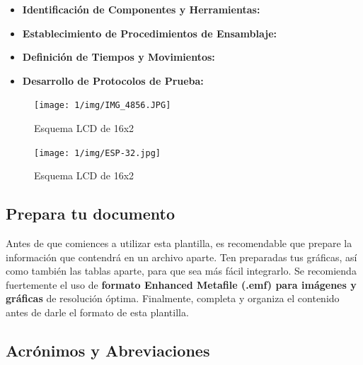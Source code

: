     
    \begin{itemize}
        
    \item \textbf{Identificación de Componentes y Herramientas:}
    
    \item \textbf{Establecimiento de Procedimientos de Ensamblaje:}
    
    \item \textbf{Definición de Tiempos y Movimientos:}
    
    \item \textbf{Desarrollo de Protocolos de Prueba:}
        
    \end{itemize}
    \begin{figure}[H]
        \centering
        \texttt{[image: 1/img/IMG\_4856.JPG]}
        \caption{Esquema LCD de 16x2}
        \label{fig:IMG_4856.JPG}
    \end{figure}
    \begin{figure}[H] 
        \centering
        \texttt{[image: 1/img/ESP-32.jpg]}
        \caption{Esquema LCD de 16x2}
    
    
        \label{fig:img/ESP-32.jpg}
    \end{figure}
    \subsection{Prepara tu documento}
    
    Antes de que comiences a utilizar esta plantilla, es recomendable que prepare la información que contendrá en un archivo aparte. 
    Ten preparadas tus gráficas, así como también las tablas aparte, para que sea más fácil integrarlo. 
    Se recomienda fuertemente el uso de \textbf{formato Enhanced Metafile (.emf) para imágenes y gráficas} de resolución óptima. 
    Finalmente, completa y organiza el contenido antes de darle el formato de esta plantilla. 
    
    \subsection{Acrónimos y Abreviaciones}
    
